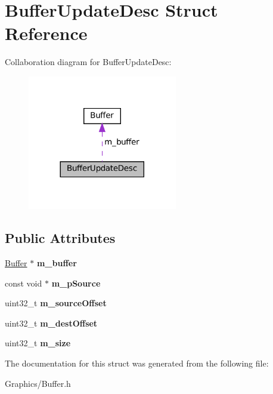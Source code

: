 \hypertarget{structBufferUpdateDesc}{}\section{Buffer\+Update\+Desc Struct Reference}
\label{structBufferUpdateDesc}


Collaboration diagram for Buffer\+Update\+Desc\+:
\nopagebreak
\begin{figure}[H]
\begin{center}
\leavevmode
\includegraphics[width=185pt]{structBufferUpdateDesc__coll__graph}
\end{center}
\end{figure}
\subsection*{Public Attributes}
\begin{DoxyCompactItemize}
\item 
\mbox{\label{structBufferUpdateDesc_ade220b235f3023166d572729aaca6b39}} 
\hyperlink{classBuffer}{Buffer} $\ast$ {\bfseries m\+\_\+buffer}
\item 
\mbox{\label{structBufferUpdateDesc_a91446ea04ab679e342aeec70e8f1d639}} 
const void $\ast$ {\bfseries m\+\_\+p\+Source}
\item 
\mbox{\label{structBufferUpdateDesc_a45260587c314ad5b3f13d12fc319d627}} 
uint32\+\_\+t {\bfseries m\+\_\+source\+Offset}
\item 
\mbox{\label{structBufferUpdateDesc_a0c7a966925823826f53fe61fb11970a4}} 
uint32\+\_\+t {\bfseries m\+\_\+dest\+Offset}
\item 
\mbox{\label{structBufferUpdateDesc_a739cfc54bbe93d4ec27ce7ddae82c7df}} 
uint32\+\_\+t {\bfseries m\+\_\+size}
\end{DoxyCompactItemize}


The documentation for this struct was generated from the following file\+:\begin{DoxyCompactItemize}
\item 
Graphics/Buffer.\+h\end{DoxyCompactItemize}

